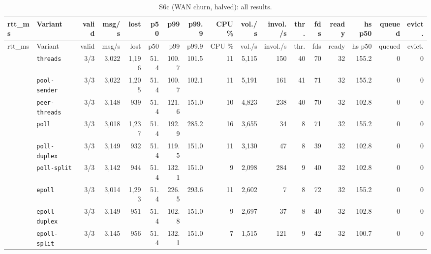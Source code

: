 \begin{longtable}{@{}llrrrrrrrrrrrrrrr@{}}
\caption{S6c (WAN churn, halved): all results.}\label{tab:full-S6c}\\
\toprule
rtt\_ms & Variant & valid & msg/s & lost & p50 & p99 & p99.9 & CPU \% & vol./s & invol./s & thr. & fds & ready & hs p50 & queued & evict. \\
\midrule
\endfirsthead
\toprule
rtt\_ms & Variant & valid & msg/s & lost & p50 & p99 & p99.9 & CPU \% & vol./s & invol./s & thr. & fds & ready & hs p50 & queued & evict. \\
\midrule
\endhead
\bottomrule
\endfoot
50 & \texttt{threads} & 3/3 & 3{,}022 & 1{,}196 & 51.4 & 100.7 & 101.5 & 11 & 5{,}115 & 150 & 40 & 70 & 32 & 155.2 & 0 & 0 \\
 & \texttt{pool-sender} & 3/3 & 3{,}022 & 1{,}205 & 51.4 & 100.7 & 102.1 & 11 & 5{,}191 & 161 & 41 & 71 & 32 & 155.2 & 0 & 0 \\
 & \texttt{peer-threads} & 3/3 & 3{,}148 & 939 & 51.4 & 121.6 & 151.0 & 10 & 4{,}823 & 238 & 40 & 70 & 32 & 102.8 & 0 & 0 \\
 & \texttt{poll} & 3/3 & 3{,}018 & 1{,}237 & 51.4 & 192.9 & 285.2 & 16 & 3{,}655 & 34 & 8 & 71 & 32 & 155.2 & 0 & 0 \\
 & \texttt{poll-duplex} & 3/3 & 3{,}149 & 932 & 51.4 & 119.5 & 151.0 & 11 & 3{,}130 & 47 & 8 & 39 & 32 & 102.8 & 0 & 0 \\
 & \texttt{poll-split} & 3/3 & 3{,}142 & 944 & 51.4 & 132.1 & 151.0 & 9 & 2{,}098 & 284 & 9 & 40 & 32 & 102.8 & 0 & 0 \\
 & \texttt{epoll} & 3/3 & 3{,}014 & 1{,}293 & 51.4 & 226.5 & 293.6 & 11 & 2{,}602 & 7 & 8 & 72 & 32 & 155.2 & 0 & 0 \\
 & \texttt{epoll-duplex} & 3/3 & 3{,}149 & 951 & 51.4 & 102.8 & 151.0 & 9 & 2{,}697 & 37 & 8 & 40 & 32 & 102.8 & 0 & 0 \\
 & \texttt{epoll-split} & 3/3 & 3{,}145 & 956 & 51.4 & 132.1 & 151.0 & 7 & 1{,}515 & 121 & 9 & 42 & 32 & 100.7 & 0 & 0 \\
\end{longtable}
